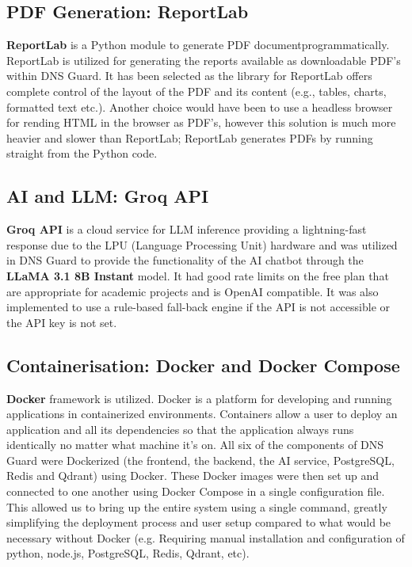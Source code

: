 \documentclass[12pt, a4paper, oneside]{report}
\begin{document}
\subsection{PDF Generation: ReportLab}

\textbf{ReportLab} \cite{reportlab2024} is a Python module to generate PDF documentprogrammatically. ReportLab is utilized for generating the reports available as downloadable PDF's within DNS Guard. It has been selected as the library for ReportLab offers complete control of the layout of the PDF and its content (e.g., tables, charts, formatted text etc.). Another choice would have been to use a headless browser for rending HTML in the browser as PDF's, however this solution is much more heavier and slower than ReportLab; ReportLab generates PDFs by running straight from the Python code.

\subsection{AI and LLM: Groq API}

\textbf{Groq API} \cite{groq2024}is a cloud service for LLM inference providing a lightning-fast response due to the LPU (Language Processing Unit) hardware and was utilized in DNS Guard to provide the functionality of the AI chatbot through the \textbf{LLaMA 3.1 8B Instant} model. It had good rate limits on the free plan that are appropriate for academic projects and is OpenAI compatible. It was also implemented to use a rule-based fall-back engine if the API is not accessible or the API key is not set.

\subsection{Containerisation: Docker and Docker Compose}

\textbf{Docker} \cite{docker2024} framework is utilized. Docker is a platform for developing and running applications in containerized environments. Containers allow a user to deploy an application and all its dependencies so that the application always runs identically no matter what machine it's on. All six of the components of DNS Guard were Dockerized (the frontend, the backend, the AI service, PostgreSQL, Redis and Qdrant) using Docker. These Docker images were then set up and connected to one another using Docker Compose in a single configuration file. This allowed us to bring up the entire system using a single command, greatly simplifying the deployment process and user setup compared to what would be necessary without Docker (e.g. Requiring manual installation and configuration of python, node.js, PostgreSQL, Redis, Qdrant, etc).
\end{document}
